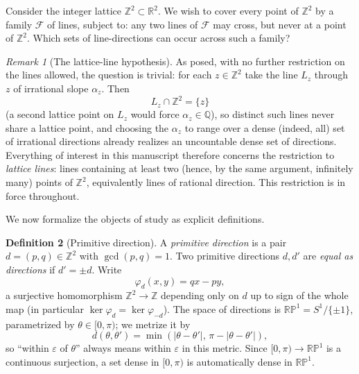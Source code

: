 \documentclass[a4paper,11pt,oneside,reqno]{amsart}
\theoremstyle{definition}
\newtheorem{definition}{Definition}
\theoremstyle{remark}
\newtheorem{remark}[definition]{Remark}
\theoremstyle{plain}
\newcommand{\Z}{\mathbb{Z}}
\newcommand{\R}{\mathbb{R}}
\newcommand{\RP}{\mathbb{RP}^1}
\begin{document}
Consider the integer lattice \(\Z^2\subset\R^2\). We wish to cover every point of \(\Z^2\) by a family
\(\mathcal F\) of lines, subject to: any two lines of \(\mathcal F\) may cross, but never at a point of
\(\Z^2\). Which sets of line-directions can occur across such a family?

\begin{remark}[The lattice-line hypothesis]
  \label{rem:hypothesis}
  As posed, with no further restriction on the lines allowed, the question is trivial: for each
  \(z\in\Z^2\) take the line \(L_z\) through \(z\) of irrational slope \(\alpha_z\). Then
  \begin{equation}
    \label{eq:irrational-line}
    L_z\cap\Z^2=\{z\}
  \end{equation}
  (a second lattice point on \(L_z\) would force \(\alpha_z\in\mathbb Q\)), so distinct such lines
  never share a lattice point, and choosing the \(\alpha_z\) to range over a dense (indeed, all) set of
  irrational directions already realizes an uncountable dense set of directions. Everything of
  interest in this manuscript therefore concerns the restriction to \emph{lattice lines}: lines
  containing at least two (hence, by the same argument, infinitely many) points of \(\Z^2\),
  equivalently lines of rational direction. This restriction is in force throughout.
\end{remark}

We now formalize the objects of study as explicit definitions.

\begin{definition}[Primitive direction]
  \label{def:direction}
  A \emph{primitive direction} is a pair \(d=(p,q)\in\Z^2\) with \(\gcd(p,q)=1\). Two primitive
  directions \(d,d'\) are \emph{equal as directions} if \(d'=\pm d\). Write
  \begin{equation}
    \label{eq:phi-def}
    \varphi_d(x,y) = qx-py,
  \end{equation}
  a surjective homomorphism \(\Z^2\to\Z\) depending only on \(d\) up to sign of the whole map (in
  particular \(\ker\varphi_d=\ker\varphi_{-d}\)). The space of directions is \(\RP=S^1/\{\pm1\}\),
  parametrized by \(\theta\in[0,\pi)\); we metrize it by
  \begin{equation}
    \label{eq:RP-metric}
    d(\theta,\theta') = \min(|\theta-\theta'|,\,\pi-|\theta-\theta'|),
  \end{equation}
  so ``within \(\varepsilon\) of \(\theta\)'' always means within \(\varepsilon\) in this metric. Since
  \([0,\pi)\to\RP\) is a continuous surjection, a set dense in \([0,\pi)\) is automatically dense in
  \(\RP\).
\end{definition}
\end{document}
